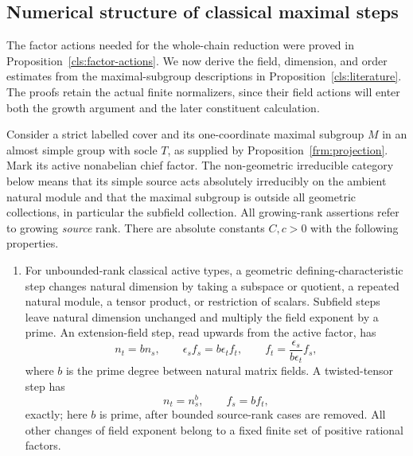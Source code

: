 \subsection{Numerical structure of classical maximal steps}

The factor actions needed for the whole-chain reduction were proved in
Proposition~\ref{cls:factor-actions}. We now derive the field, dimension,
and order estimates from the maximal-subgroup descriptions in
Proposition~\ref{cls:literature}. The proofs retain the actual finite
normalizers, since their field actions will enter both the growth
argument and the later constituent calculation.

\begin{proposition}\label{cls:catalogue}
Consider a strict labelled cover and its one-coordinate maximal subgroup
$M$ in an almost simple group with socle $T$, as supplied by
Proposition~\ref{frm:projection}.  Mark its active nonabelian chief factor.
The non-geometric irreducible category below means that its simple
source acts absolutely irreducibly on the ambient natural module
and that the maximal subgroup is outside all geometric collections,
in particular the subfield collection.  All growing-rank assertions
refer to growing \emph{source} rank.
There are absolute constants $C,c>0$ with the following properties.
\begin{enumerate}[label=\textup{(C\arabic*)},start=2]
\item\label{cls:cat-geometric}
For unbounded-rank classical active types, a geometric
defining-characteristic step changes natural dimension by taking a
subspace or quotient, a repeated natural module, a tensor product, or
restriction of scalars.  Subfield steps leave natural dimension
unchanged and multiply the field exponent by a prime.  An
extension-field step, read upwards from the active factor, has
\begin{equation}\label{grw:matrix-field-convention}
 n_t=b n_s,\qquad
 \epsilon_s f_s=b\epsilon_t f_t,
 \qquad f_t=\frac{\epsilon_s}{b\epsilon_t}f_s,
\end{equation}
where $b$ is the prime degree between natural matrix fields.
A twisted-tensor step has
\begin{equation}\label{grw:twisted-field-convention}
 n_t=n_s^b,\qquad f_s=b f_t,
\end{equation}
exactly; here $b$ is prime, after bounded source-rank cases are
removed.  All other changes of field exponent
belong to a fixed finite set of positive rational factors.

\end{enumerate}
\end{proposition}
